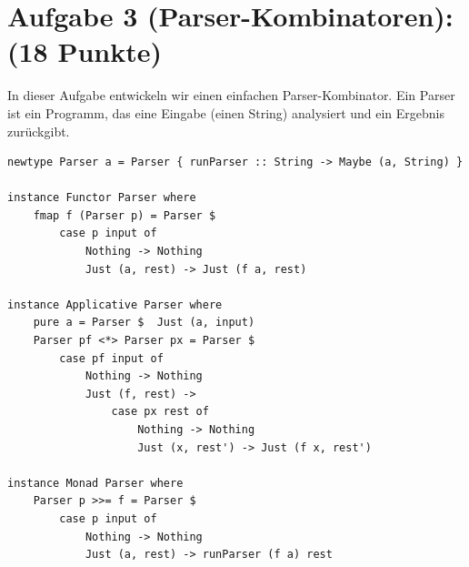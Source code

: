 \documentclass[12pt,a4paper]{article}
\makeatletter
\def\cleardoublepage{\clearpage\if@twoside\ifodd\c@page\else%
\hbox{}%
\thispagestyle{empty}%
\newpage%
\if@twocolumn\hbox{}\newpage\fi\fi\fi}
\makeatother
\begin{document}
\cleardoublepage

\section*{Aufgabe 3 (Parser-Kombinatoren): (18 Punkte)}

In dieser Aufgabe entwickeln wir einen einfachen Parser-Kombinator. Ein Parser ist ein Programm, das eine Eingabe (einen String) analysiert und ein Ergebnis zurückgibt.

\begin{verbatim}
newtype Parser a = Parser { runParser :: String -> Maybe (a, String) }

instance Functor Parser where
    fmap f (Parser p) = Parser $ 
        case p input of
            Nothing -> Nothing
            Just (a, rest) -> Just (f a, rest)

instance Applicative Parser where
    pure a = Parser $  Just (a, input)
    Parser pf <*> Parser px = Parser $ 
        case pf input of
            Nothing -> Nothing
            Just (f, rest) ->
                case px rest of
                    Nothing -> Nothing
                    Just (x, rest') -> Just (f x, rest')

instance Monad Parser where
    Parser p >>= f = Parser $ 
        case p input of
            Nothing -> Nothing
            Just (a, rest) -> runParser (f a) rest
\end{verbatim}
\end{document}
